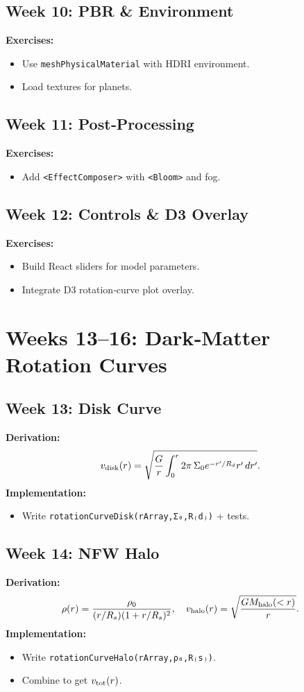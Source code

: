 \documentclass[11pt]{article}
\begin{document}
\subsection{Week 10: PBR \& Environment}
\textbf{Exercises:}
\begin{itemize}
  \item Use \texttt{meshPhysicalMaterial} with HDRI environment.
  \item Load textures for planets.
\end{itemize}
\subsection{Week 11: Post‑Processing}
\textbf{Exercises:}
\begin{itemize}
  \item Add \texttt{<EffectComposer>} with \texttt{<Bloom>} and fog.
\end{itemize}
\subsection{Week 12: Controls \& D3 Overlay}
\textbf{Exercises:}
\begin{itemize}
  \item Build React sliders for model parameters.
  \item Integrate D3 rotation‑curve plot overlay.
\end{itemize}

\section{Weeks 13--16: Dark‑Matter Rotation Curves}
\subsection{Week 13: Disk Curve}
\textbf{Derivation:}
\[
  v_{\rm disk}(r)
  = \sqrt{\frac{G}{r}\int_{0}^{r}2\pi\,\Sigma_{0} e^{-r'/R_d} r'\,dr'}.
\]
\textbf{Implementation:}
\begin{itemize}
  \item Write \texttt{rotationCurveDisk(rArray,Σ₀,R₍d₎)} + tests.
\end{itemize}
\subsection{Week 14: NFW Halo}
\textbf{Derivation:}
\[
  \rho(r)=\frac{\rho_{0}}{(r/R_{s})(1+r/R_{s})^{2}},
\quad
v_{\rm halo}(r)=\sqrt{\frac{G M_{\rm halo}(<r)}{r}}.
\]
\textbf{Implementation:}
\begin{itemize}
  \item Write \texttt{rotationCurveHalo(rArray,ρ₀,R₍s₎)}.
  \item Combine to get \(v_{\rm tot}(r)\).
\end{itemize}
\end{document}
